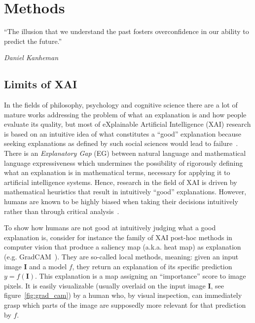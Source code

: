 \chapter{Methods}
\label{ch:methods}

\epigraph{\enquote{The illusion that we understand the past fosters overconfidence in our ability to predict the future.}}{\emph{Daniel Kanheman}}

\section{Limits of XAI}
\label{sec:limits of XAI}
In the fields of philosophy, psychology and cognitive science there are a lot of mature works addressing the problem of what an explanation is and how people evaluate its quality, but most of eXplainable Artificial Intelligence (XAI) research is based on an intuitive idea of what constitutes a “good” explanation because seeking explanations as defined by such social sciences would lead to failure~\cite{Miller}.
There is an \textit{Explanatory Gap} (EG) between natural language and mathematical language expressiveness which undermines the possibility of rigorously defining what an explanation is in mathematical terms, necessary for applying it to artificial intelligence systems.
Hence, research in the field of XAI is driven by mathematical heuristics that result in intuitively “good” explanations.
However, humans are known to be highly biased when taking their decisions intuitively rather than through critical analysis~\cite{Kahneman}. 

To show how humans are not good at intuitively judging what a good explanation is, consider for instance the family of XAI post-hoc methods in computer vision that produce a saliency map (a.k.a. heat map) as explanation (e.g. GradCAM~\cite{GradCAM}).
They are so-called local methods, meaning: given an input image $\mathbf{I}$ and a model $f$, they return an explanation of its specific prediction $y = f(\mathbf{I})$.
This explanation is a map assigning an “importance” score to image pixels.
It is easily visualizable (usually overlaid on the input image $\mathbf{I}$, see figure~\ref{fig:grad_cam}) by a human who, by visual inspection, can immediately grasp which parts of the image are supposedly more relevant for that prediction by $f$.

